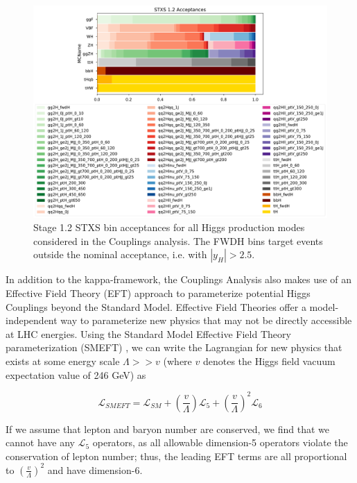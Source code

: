\begin{figure}[tbp]
        \centering
        \includegraphics[width=\linewidth]{figures/theory_chapter/STXS_acceptances.pdf}
        \caption{Stage 1.2 STXS bin acceptances for all Higgs production modes considered in the Couplings analysis. The FWDH bins target events outside the nominal acceptance, i.e. with $|y_{H}|>2.5$.}
        \label{fig:STXS_acceptances}
\end{figure}


\iffalse
In addition to the kappa-framework, the Couplings Analysis also makes use of an Effective Field Theory (EFT) approach to parameterize potential Higgs Couplings beyond the Standard Model. Effective Field Theories offer a model-independent way to parameterize new physics that may not be directly accessible at LHC energies. Using the Standard Model Effective Field Theory parameterization (SMEFT) \cite{SMEFT}, we can write the Lagrangian for new physics that exists at some energy scale $\Lambda >> v$ (where $v$ denotes the Higgs field vacuum expectation value of 246 GeV) as

\begin{equation}
\mathcal{L}_{SMEFT} = \mathcal{L}_{SM} + (\frac{v}{\Lambda})\mathcal{L}_{5} + (\frac{v}{\Lambda})^2 \mathcal{L}_{6}
\end{equation}

If we assume that lepton and baryon number are conserved, we find that we cannot have any $\mathcal{L}_{5}$ operators, as all allowable dimension-5 operators violate the conservation of lepton number; thus, the leading EFT terms are all proportional to $(\frac{v}{\Lambda})^2$ and have dimension-6.

